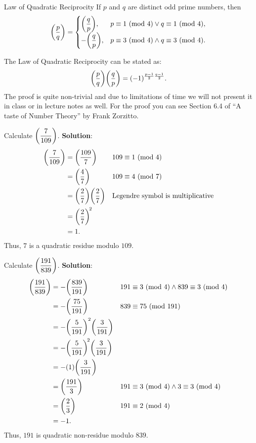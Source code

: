\begin{Theorem}{Law of Quadratic Reciprocity}{}
    If $ p $ and $ q $ are distinct odd prime numbers, then
    \[ \biggl(\dfrac{p}{q}\biggr)=\begin{cases}
            \biggl(\dfrac{q}{p}\biggr),  & p\equiv 1\ (\mathrm{mod}\ 4)\lor q\equiv 1\ (\mathrm{mod}\ 4),  \\
            -\biggl(\dfrac{q}{p}\biggr), & p\equiv 3\ (\mathrm{mod}\ 4)\land q\equiv 3\ (\mathrm{mod}\ 4).
        \end{cases} \]
\end{Theorem}
The Law of Quadratic Reciprocity can be stated as:
\[ \biggl(\dfrac{p}{q}\biggr)\biggl(\dfrac{q}{p}\biggr)=(-1)^{\frac{p-1}{2}\frac{q-1}{2}}. \]
The proof is quite non-trivial and due to limitations of time we will not present
it in class or in lecture notes as well. For the proof you can see Section 6.4 of ``A taste
of Number Theory'' by Frank Zorzitto.
\begin{Example}{}{}
    Calculate $ \biggl(\dfrac{7}{109}\biggr) $.
    \tcblower{}
    \textbf{Solution}:
    \begin{align*}
        \biggl(\dfrac{7}{109}\biggr) & =\biggl(\dfrac{109}{7}\biggr)              &  & 109\equiv 1\ (\mathrm{mod}\ 4)                       \\
                          & =\biggl(\dfrac{4}{7}\biggr)                &  & 109\equiv 4\ (\mathrm{mod}\ 7)                       \\
                          & =\biggl(\dfrac{2}{7}\biggr)\biggl(\dfrac{2}{7}\biggr) &  & \text{Legendre symbol is multiplicative} \\
                          & =\biggl(\dfrac{2}{7}\biggr)^{\!2}                                                        \\
                          & =1.
    \end{align*}
    Thus, $ 7 $ is a quadratic residue modulo $ 109 $.
\end{Example}
\begin{Example}{}{}
    Calculate $ \biggl(\dfrac{191}{839}\biggr) $.
    \tcblower{}
    \textbf{Solution}:
    \begin{align*}
        \biggl(\dfrac{191}{839}\biggr)
         & =-\biggl(\dfrac{839}{191}\biggr)                      &  & 191\equiv 3\ (\mathrm{mod}\ 4)\land 839\equiv 3\ (\mathrm{mod}\ 4) \\
         & =-\biggl(\dfrac{75}{191}\biggr)                       &  & 839\equiv 75\ (\mathrm{mod}\ 191)                      \\
         & =-\biggl(\dfrac{5}{191}\biggr)^2 \biggl(\dfrac{3}{191}\biggr)                                                    \\
         & =-\biggl(\dfrac{5}{191}\biggr)^{\!2}\biggl(\dfrac{3}{191}\biggr)                                                 \\
         & =-(1)\biggl(\dfrac{3}{191}\biggr)                                                                     \\
         & =\biggl(\dfrac{191}{3}\biggr)                         &  & 191\equiv 3\ (\mathrm{mod}\ 4)\land 3 \equiv 3\ (\mathrm{mod}\ 4)  \\
         & =\biggl(\dfrac{2}{3}\biggr)                           &  & 191\equiv 2\ (\mathrm{mod}\ 4)                         \\
         & =-1.
    \end{align*}
    Thus, $191$ is quadratic non-residue modulo $839$.
\end{Example}
